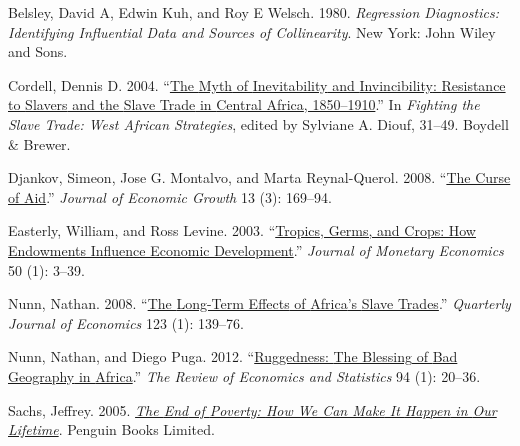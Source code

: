 \documentclass[
  letterpaper,
  DIV=11,
  numbers=noendperiod]{scrartcl}
\newlength{\cslhangindent}
\newenvironment{CSLReferences}[2] %
 {\begin{list}{}{%
  \setlength{\itemindent}{0pt}
  \setlength{\leftmargin}{0pt}
  \setlength{\parsep}{0pt}
  \ifodd #1
   \setlength{\leftmargin}{\cslhangindent}
   \setlength{\itemindent}{-1\cslhangindent}
  \fi
  \setlength{\itemsep}{#2\baselineskip}}}
 {\end{list}}
\begin{document}
\label{refs}
\begin{CSLReferences}{1}{0}
Belsley, David A, Edwin Kuh, and Roy E Welsch. 1980. \emph{Regression
Diagnostics: {Identifying} Influential Data and Sources of
Collinearity}. New York: {John Wiley and Sons}.

Cordell, Dennis D. 2004.
{``\href{https://www.cambridge.org/core/books/fighting-the-slave-trade/myth-of-inevitability-and-invincibility-resistance-to-slavers-and-the-slave-trade-in-central-africa-18501910/E2E9819E2BBD9A958F4BB7CDC505764C}{The
{Myth} of {Inevitability} and {Invincibility}: {Resistance} to {Slavers}
and the {Slave Trade} in {Central Africa}, 1850--1910}.''} In
\emph{Fighting the {Slave Trade}: {West African Strategies}}, edited by
Sylviane A. Diouf, 31--49. Boydell \& Brewer.

Djankov, Simeon, Jose G. Montalvo, and Marta Reynal-Querol. 2008.
{``\href{https://doi.org/10.1007/s10887-008-9032-8}{The Curse of
Aid}.''} \emph{Journal of Economic Growth} 13 (3): 169--94.

Easterly, William, and Ross Levine. 2003.
{``\href{https://doi.org/10.1016/S0304-3932(02)00200-3}{Tropics, Germs,
and Crops: How Endowments Influence Economic Development}.''}
\emph{Journal of Monetary Economics} 50 (1): 3--39.

Nunn, Nathan. 2008.
{``\href{https://doi.org/10.1162/qjec.2008.123.1.139}{The {Long-Term
Effects} of {Africa}'s {Slave Trades}}.''} \emph{Quarterly Journal of
Economics} 123 (1): 139--76.

Nunn, Nathan, and Diego Puga. 2012.
{``\href{https://www.jstor.org/stable/41349158}{Ruggedness: {The
Blessing} of {Bad Geography} in {Africa}}.''} \emph{The Review of
Economics and Statistics} 94 (1): 20--36.

Sachs, Jeffrey. 2005.
\emph{\href{https://books.google.com?id=uzhveDZnv_gC}{The {End} of
{Poverty}: {How We Can Make} It {Happen} in {Our Lifetime}}}. Penguin
Books Limited.

\end{CSLReferences}
\end{document}
